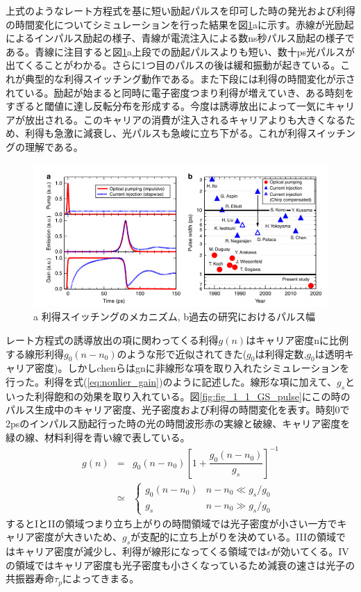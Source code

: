 上式のようなレート方程式を基に短い励起パルスを印可した時の発光および利得の時間変化についてシミュレーションを行った結果を図\ref{fig:fig_1_1_GS_ito}aに示す。赤線が光励起によるインパルス励起の様子、青線が電流注入による数ns秒パルス励起の様子である。青線に注目すると図\ref{fig:fig_1_1_GS_ito}a上段での励起パルスよりも短い、数十ps光パルスが出てくることがわかる。さらに1つ目のパルスの後は緩和振動が起きている。これが典型的な利得スイッチング動作である。また下段には利得の時間変化が示されている。励起が始まると同時に電子密度つまり利得が増えていき、ある時刻をすぎると閾値に達し反転分布を形成する。今度は誘導放出によって一気にキャリアが放出される。このキャリアの消費が注入されるキャリアよりも大きくなるため、利得も急激に減衰し、光パルスも急峻に立ち下がる。これが利得スイッチングの理解である。

\begin{figure}[h]
	\centering
	\includegraphics[width=15cm]{figure/fig_1_1_GS_ito.png}
	\caption{a 利得スイッチングのメカニズム, b過去の研究におけるパルス幅\cite{ref_t_ito}}
	\label{fig:fig_1_1_GS_ito}
\end{figure}


レート方程式の誘導放出の項に関わってくる利得$g(n)$はキャリア密度nに比例する線形利得$g_{0}(n-n_{0})$のような形で近似されてきた($g_{0}$は利得定数,$g_{0}$は透明キャリア密度)。しかしchenらはg{n}に非線形な項を取り入れたシミュレーションを行った。利得を式(\ref{eq:nonlier_gain})のように記述した。線形な項に加えて、$g_{s}$といった利得飽和の効果を取り入れている。図\ref{fig:fig_1_1_GS_pulse}にこの時のパルス生成中のキャリア密度、光子密度および利得の時間変化を表す。時刻0で2psのインパルス励起行った時の光の時間波形赤の実線と破線、キャリア密度を緑の線、材料利得を青い線で表している。
\begin{eqnarray}
g(n)&=&g_{0}(n-n_{0})\left[1+\dfrac{g_{0}(n-n_{0})}{g_{s}}\right]^{-1}\\
\label{eq:nonlier_gain}
&\simeq &\left\{
\begin{array}{ll}
 g_{0}(n-n_{0}) & n-n_{0}\ll g_{s}/g_{0}\nonumber \\
g_{s} & n-n_{0}\gg g_{s}/g_{0}\nonumber
\end{array}
\right.
\end{eqnarray}
するとIとIIの領域つまり立ち上がりの時間領域では光子密度が小さい一方でキャリア密度が大きいため、$g_{s}$が支配的に立ち上がりを決めている。IIIの領域ではキャリア密度が減少し、利得が線形になってくる領域では$\epsilon$が効いてくる。IVの領域ではキャリア密度も光子密度も小さくなっているため減衰の速さは光子の共振器寿命$\tau_{p}$によってきまる。

